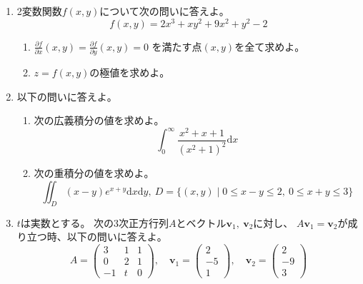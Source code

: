 \documentclass[12pt,b5paper]{ltjsarticle}
\begin{document}
\begin{enumerate}
 \item 2変数関数$f(x,y)$について次の問いに答えよ。
       \begin{equation}
        f(x,y) = 2x^3 + xy^2 + 9x^2 + y^2 - 2
       \end{equation}
       \begin{enumerate}
        \item $\displaystyle \frac{\partial f}{\partial x}(x,y) = \frac{\partial f}{\partial y}(x,y) = 0$
              を満たす点$(x,y)$を全て求めよ。
        \item $z=f(x,y)$の極値を求めよ。
       \end{enumerate}
 \item 以下の問いに答えよ。
       \begin{enumerate}
        \item 次の広義積分の値を求めよ。
              \begin{equation}
               \int_{0}^{\infty}\frac{x^2+x+1}{(x^2+1)^2}\mathrm{d}x
              \end{equation}
        \item 次の重積分の値を求めよ。
              \begin{equation}
               \iint_{D}(x-y)e^{x+y}\mathrm{d}x\mathrm{d}y,
                \
                D=\{ (x,y) \mid 0 \leq x-y \leq 2,\ 0\leq x+y \leq 3 \}
              \end{equation}
       \end{enumerate}
 \item $t$は実数とする。
       次の3次正方行列$A$とベクトル$\bm{v}_1, \ \bm{v}_2$に対し、
       $A\bm{v}_1 = \bm{v}_2$が成り立つ時、以下の問いに答えよ。
       \begin{equation}
        A=\begin{pmatrix} 3 & 1 & 1 \\ 0 & 2 & 1 \\ -1 & t & 0 \end{pmatrix},
        \quad
         \bm{v}_1=\begin{pmatrix} 2 \\ -5 \\ 1 \end{pmatrix},
         \quad
         \bm{v}_2=\begin{pmatrix} 2 \\ -9 \\ 3 \end{pmatrix}
       \end{equation}

\end{enumerate}
\end{document}
